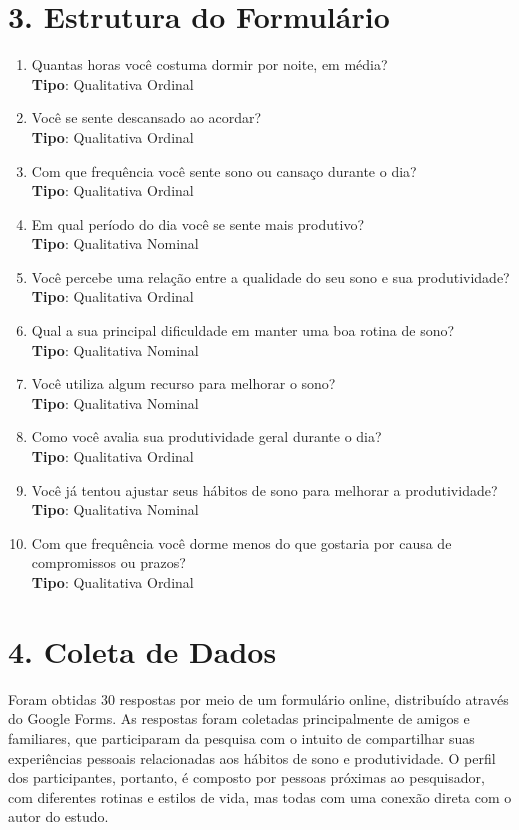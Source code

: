 \documentclass[12pt,a4paper]{article}
\begin{document}
\section*{3. Estrutura do Formulário}
\begin{enumerate}
    \item Quantas horas você costuma dormir por noite, em média? \\
    \textbf{Tipo}: Qualitativa Ordinal
    \item Você se sente descansado ao acordar? \\
    \textbf{Tipo}: Qualitativa Ordinal
    \item Com que frequência você sente sono ou cansaço durante o dia? \\
    \textbf{Tipo}: Qualitativa Ordinal
    \item Em qual período do dia você se sente mais produtivo? \\
    \textbf{Tipo}: Qualitativa Nominal
    \item Você percebe uma relação entre a qualidade do seu sono e sua produtividade? \\
    \textbf{Tipo}: Qualitativa Ordinal
    \item Qual a sua principal dificuldade em manter uma boa rotina de sono? \\
    \textbf{Tipo}: Qualitativa Nominal
    \item Você utiliza algum recurso para melhorar o sono? \\
    \textbf{Tipo}: Qualitativa Nominal
    \item Como você avalia sua produtividade geral durante o dia? \\
    \textbf{Tipo}: Qualitativa Ordinal
    \item Você já tentou ajustar seus hábitos de sono para melhorar a produtividade? \\
    \textbf{Tipo}: Qualitativa Nominal
    \item Com que frequência você dorme menos do que gostaria por causa de compromissos ou prazos? \\
    \textbf{Tipo}: Qualitativa Ordinal
\end{enumerate}


\section*{4. Coleta de Dados}
Foram obtidas 30 respostas por meio de um formulário online, distribuído através do Google Forms. As respostas foram coletadas principalmente de amigos e familiares, que participaram da pesquisa com o intuito de compartilhar suas experiências pessoais relacionadas aos hábitos de sono e produtividade. O perfil dos participantes, portanto, é composto por pessoas próximas ao pesquisador, com diferentes rotinas e estilos de vida, mas todas com uma conexão direta com o autor do estudo.
\end{document}
